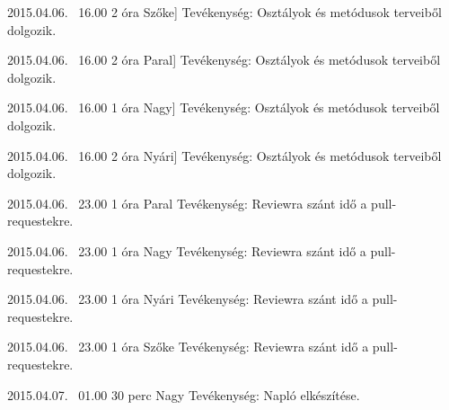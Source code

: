 \begin{naplo}
    \bejegyzes
    {2015.04.06. ~16.00}
    {2 óra}
    {Szőke]} 
    { Tevékenység: Osztályok és metódusok terveiből dolgozik.\newline }    

    \bejegyzes
    {2015.04.06. ~16.00}
    {2 óra}
    {Paral]} 
    { Tevékenység: Osztályok és metódusok terveiből dolgozik.\newline }    
    
    \bejegyzes
    {2015.04.06. ~16.00}
    {1 óra}
    {Nagy]} 
    { Tevékenység: Osztályok és metódusok terveiből dolgozik.\newline }    
    
    \bejegyzes
    {2015.04.06. ~16.00}
    {2 óra}
    {Nyári]} 
    { Tevékenység: Osztályok és metódusok terveiből dolgozik.\newline }    
    
    \bejegyzes
    {2015.04.06. ~23.00}
    {1 óra}
    {Paral} 
    {Tevékenység: Reviewra szánt idő a pull-requestekre.\newline } 

    \bejegyzes
    {2015.04.06. ~23.00}
    {1 óra}
    {Nagy} 
    {Tevékenység: Reviewra szánt idő a pull-requestekre.\newline } 

    \bejegyzes
    {2015.04.06. ~23.00}
    {1 óra}
    {Nyári} 
    {Tevékenység: Reviewra szánt idő a pull-requestekre.\newline } 

    \bejegyzes
    {2015.04.06. ~23.00}
    {1 óra}
    {Szőke} 
    {Tevékenység: Reviewra szánt idő a pull-requestekre.\newline } 
    
	\bejegyzes
	{2015.04.07. ~01.00}
	{30 perc}
	{Nagy} 
	{Tevékenység: Napló elkészítése.\newline } 
	
\end{naplo}



